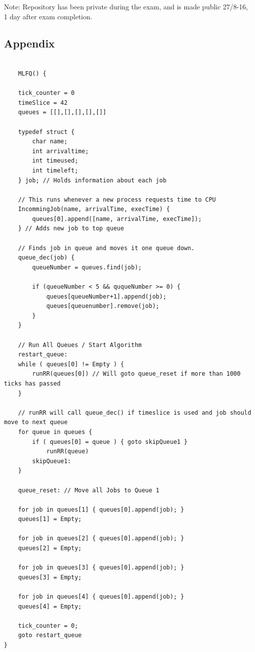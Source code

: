 \documentclass[11pt,a4paper]{article}
\theoremstyle{plain}
\theoremstyle{definition}
\theoremstyle{remark}
\numberwithin{equation}{section}
\begin{document}
Note: Repository has been private during the exam, and is made public 27/8-16, 1 day after exam completion.

\subsection*{Appendix}

\begin{lstlisting}[caption={MLFQ Algorithm},label={lst:mlfq}]

    MLFQ() {
    
    tick_counter = 0
    timeSlice = 42
    queues = [[],[],[],[],[]]
    
    typedef struct {
        char name;
        int arrivaltime;
        int timeused;
        int timeleft;
    } job; // Holds information about each job
    
    // This runs whenever a new process requests time to CPU
    IncommingJob(name, arrivalTime, execTime) {
        queues[0].append([name, arrivalTime, execTime]);
    } // Adds new job to top queue

    // Finds job in queue and moves it one queue down.
    queue_dec(job) {
        queueNumber = queues.find(job);
        
        if (queueNumber < 5 && ququeNumber >= 0) {
            queues[queueNumber+1].append(job);
            queues[queuenumber].remove(job);
        }
    }
    
    // Run All Queues / Start Algorithm
    restart_queue:
    while ( queues[0] != Empty ) {
        runRR(queues[0]) // Will goto queue_reset if more than 1000 ticks has passed
    }
 
    // runRR will call queue_dec() if timeslice is used and job should move to next queue
    for queue in queues {
        if ( queues[0] = queue ) { goto skipQueue1 }
            runRR(queue)
        skipQueue1:
    }
    
    queue_reset: // Move all Jobs to Queue 1
    
    for job in queues[1] { queues[0].append(job); }
    queues[1] = Empty;
    
    for job in queues[2] { queues[0].append(job); }
    queues[2] = Empty;
    
    for job in queues[3] { queues[0].append(job); }
    queues[3] = Empty;
    
    for job in queues[4] { queues[0].append(job); }
    queues[4] = Empty;

    tick_counter = 0;
    goto restart_queue
}
\end{lstlisting}
\end{document}
